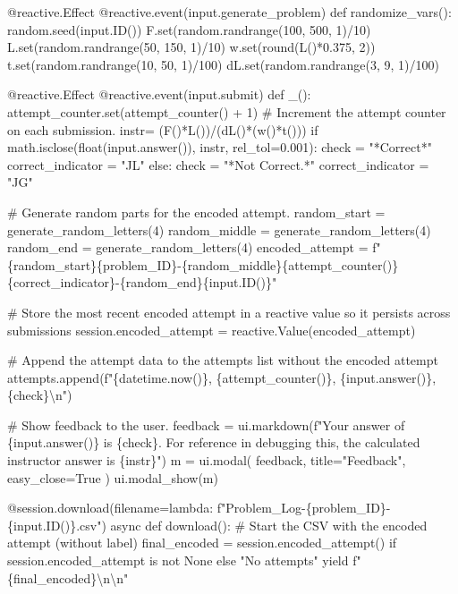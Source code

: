 \documentclass[
  letterpaper,
  DIV=11,
  numbers=noendperiod]{scrreprt}
\newenvironment{Shaded}{\begin{snugshade}}{\end{snugshade}}
\newcommand{\NormalTok}[1]{\textcolor[rgb]{0.00,0.23,0.31}{#1}}
\begin{document}
\begin{Shaded}
\begin{Highlighting}[]
\NormalTok{    @reactive.Effect}
\NormalTok{    @reactive.event(input.generate\_problem)}
\NormalTok{    def randomize\_vars():}
\NormalTok{        random.seed(input.ID())}
\NormalTok{        F.set(random.randrange(100, 500, 1)/10)}
\NormalTok{        L.set(random.randrange(50, 150, 1)/10)}
\NormalTok{        w.set(round(L()*0.375, 2))}
\NormalTok{        t.set(random.randrange(10, 50, 1)/100)}
\NormalTok{        dL.set(random.randrange(3, 9, 1)/100)}
        
\NormalTok{    @reactive.Effect}
\NormalTok{    @reactive.event(input.submit)}
\NormalTok{    def \_():}
\NormalTok{        attempt\_counter.set(attempt\_counter() + 1)  \# Increment the attempt counter on each submission.}
\NormalTok{        instr= (F()*L())/(dL()*(w()*t()))}
\NormalTok{        if math.isclose(float(input.answer()), instr, rel\_tol=0.001):}
\NormalTok{            check = "*Correct*"}
\NormalTok{            correct\_indicator = "JL"}
\NormalTok{        else:}
\NormalTok{            check = "*Not Correct.*"}
\NormalTok{            correct\_indicator = "JG"}

\NormalTok{        \# Generate random parts for the encoded attempt.}
\NormalTok{        random\_start = generate\_random\_letters(4)}
\NormalTok{        random\_middle = generate\_random\_letters(4)}
\NormalTok{        random\_end = generate\_random\_letters(4)}
\NormalTok{        encoded\_attempt = f"\{random\_start\}\{problem\_ID\}{-}\{random\_middle\}\{attempt\_counter()\}\{correct\_indicator\}{-}\{random\_end\}\{input.ID()\}"}

\NormalTok{        \# Store the most recent encoded attempt in a reactive value so it persists across submissions}
\NormalTok{        session.encoded\_attempt = reactive.Value(encoded\_attempt)}

\NormalTok{        \# Append the attempt data to the attempts list without the encoded attempt}
\NormalTok{        attempts.append(f"\{datetime.now()\}, \{attempt\_counter()\}, \{input.answer()\}, \{check\}\textbackslash{}n")}

\NormalTok{        \# Show feedback to the user.}
\NormalTok{        feedback = ui.markdown(f"Your answer of \{input.answer()\} is \{check\}. For reference in debugging this, the calculated instructor answer is \{instr\}")}
\NormalTok{        m = ui.modal(}
\NormalTok{            feedback,}
\NormalTok{            title="Feedback",}
\NormalTok{            easy\_close=True}
\NormalTok{        )}
\NormalTok{        ui.modal\_show(m)}

\NormalTok{    @session.download(filename=lambda: f"Problem\_Log{-}\{problem\_ID\}{-}\{input.ID()\}.csv")}
\NormalTok{    async def download():}
\NormalTok{        \# Start the CSV with the encoded attempt (without label)}
\NormalTok{        final\_encoded = session.encoded\_attempt() if session.encoded\_attempt is not None else "No attempts"}
\NormalTok{        yield f"\{final\_encoded\}\textbackslash{}n\textbackslash{}n"}
        

\end{Highlighting}
\end{Shaded}
\end{document}
